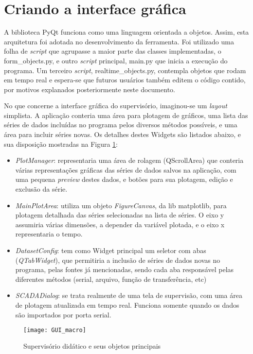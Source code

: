 \section{Criando a interface gráfica}

A biblioteca PyQt funciona como uma linguagem orientada a objetos. Assim, esta arquitetura foi adotada no desenvolvimento da ferramenta. Foi utilizado uma folha de \emph{script} que agrupasse a maior parte das classes implementadas, o form\_objects.py, e outro \emph{script} principal, main.py que inicia a execução do programa. Um terceiro \emph{script}, realtime\_objects.py, contempla objetos que rodam em tempo real e espera-se que futuros usuários também editem o código contido, por motivos explanados posteriormente neste documento.

No que concerne a interface gráfica do supervisório, imaginou-se um \emph{layout} simplista. A aplicação conteria uma área para plotagem de gráficos, uma lista das séries de dados incluídas no programa pelos diversos métodos possíveis, e uma área para incluir séries novas. Os detalhes destes Widgets são listados abaixo, e sua disposição mostradas na Figura \ref{img_gui_macro}:

\begin{itemize}
	\item \emph{PlotManager}: representaria uma área de rolagem (QScrollArea) que conteria várias representações gráficas das séries de dados salvos na aplicação, com uma pequena \emph{preview} destes dados, e botões para sua plotagem, edição e exclusão da série.
	\item \emph{MainPlotArea}: utiliza um objeto \emph{FigureCanvas}, da lib matplotlib, para plotagem detalhada das séries selecionadas na lista de séries. O eixo y assumiria várias dimensões, a depender da variável plotada, e o eixo x representaria o tempo.
	\item \emph{DatasetConfig}: tem como Widget principal um seletor com abas (\emph{QTabWidget}), que permitiria a inclusão de séries de dados novas no programa, pelas fontes já mencionadas, sendo cada aba responsável pelas diferentes métodos (serial, arquivo, função de transferência, etc)
	\item \emph{SCADADialog}: se trata realmente de uma tela de supervisão, com uma área de plotagem atualizada em tempo real. Funciona somente quando os dados são importados por porta serial.
\end{itemize}

\begin{figure}[hbt]
	\centering
	\caption{Supervisório didático e seus objetos principais}
	\texttt{[image: GUI\_macro]}
	\label{img_gui_macro}
\end{figure}

